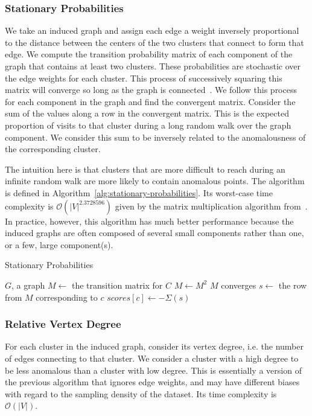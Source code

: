 \subsubsection{Stationary Probabilities}
\label{subsubsec:methods:individual-algorithms:stationary-probabilities}
We take an induced graph and assign each edge a weight inversely proportional to the distance between the centers of the two clusters that connect to form that edge.
We compute the transition probability matrix of each component of the graph that contains at least two clusters.
These probabilities are stochastic over the edge weights for each cluster.
This process of successively squaring this matrix will converge so long as the graph is connected~\cite{levin2017markov}.
We follow this process for each component in the graph and find the convergent matrix.
Consider the sum of the values along a row in the convergent matrix.
This is the expected proportion of visits to that cluster during a long random walk over the graph component.
We consider this sum to be inversely related to the anomalousness of the corresponding cluster.

The intuition here is that clusters that are more difficult to reach during an infinite random walk are more likely to contain anomalous points.
The algorithm is defined in Algorithm~\ref{alg:stationary-probabilities}.
Its worst-case time complexity is $\mathcal{O}(|V|^{2.3728596})$ given by the matrix multiplication algorithm from~\cite{alman2021refined}.
In practice, however, this algorithm has much better performance because the induced graphs are often composed of several small components rather than one, or a few, large component(s).

\begin{algorithm}[h]
    \caption{Stationary Probabilities}
    \label{alg:stationary-probabilities}
\begin{algorithmic}[1]
    \REQUIRE $G$, a graph
        \STATE $M \gets$ the transition matrix for $C$
        \REPEAT
            \STATE $M \gets M^2$
        \UNTIL $M$ converges
            \STATE $s \gets $ the row from $M$ corresponding to $c$
            \STATE $scores[c] \gets -\Sigma(s)$ 
        \ENDFOR
    \ENDFOR
\end{algorithmic}
\end{algorithm}


\subsubsection{Relative Vertex Degree}
\label{subsubsec:methods:individual-algorithms:relative-vertex-degree}
For each cluster in the induced graph, consider its vertex degree, i.e. the number of edges connecting to that cluster.
We consider a cluster with a high degree to be less anomalous than a cluster with low degree.
This is essentially a version of the previous algorithm that ignores edge weights, and may have different biases with regard to the sampling density of the dataset.
Its time complexity is $\mathcal{O}(|V|)$.

